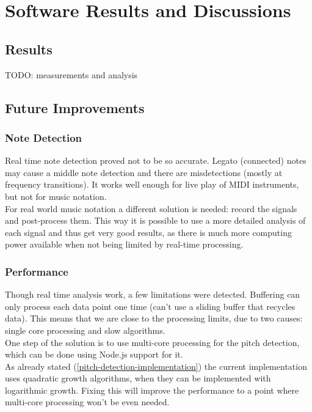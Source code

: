 \chapter{Software Results and Discussions}

\section{Results}
TODO: measurements and analysis

\section{Future Improvements}
\subsection{Note Detection}
Real time note detection proved not to be so accurate. Legato (connected) notes
may cause a middle note detection and there are misdetections (mostly at frequency
transitions). It works well enough for live play of MIDI instruments, but not
for music notation. \\
For real world music notation a different solution is needed: record the signals
and post-process them. This way it is possible to use a more detailed analysis
of each signal and thus get very good results, as there is much more computing
power available when not being limited by real-time processing.

\subsection{Performance}
Though real time analysis work, a few limitations were detected. Buffering can only
process each data point one time (can't use a sliding buffer that recycles data).
This means that we are close to the processing limits, due to two causes: single
core processing and slow algorithms. \\
One step of the solution is to use multi-core processing for the pitch detection,
which can be done using Node.js support for it. \\
As already stated (\autoref{pitch-detection-implementation}) the current implementation
uses quadratic growth algorithms, when they can be implemented with logarithmic
growth. Fixing this will improve the performance to a point where multi-core processing
won't be even needed.
